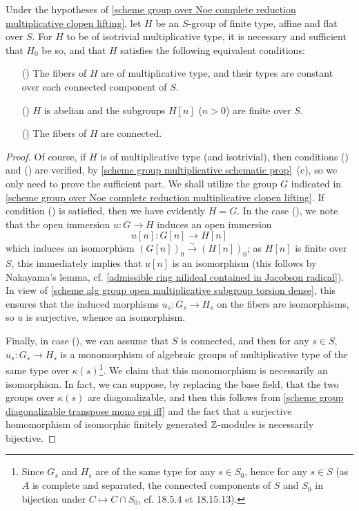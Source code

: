 \begin{corollary}\label{scheme group multiplicative over Noe complete isotrivial and reduction}
Under the hypotheses of \cref{scheme group over Noe complete reduction multiplicative clopen lifting}, let $H$ be an $S$-group of finite type, affine and flat over $S$. For $H$ to be of isotrivial multiplicative type, it is necessary and sufficient that $H_0$ be so, and that $H$ satisfies the following equivalent conditions:
\begin{enumerate}
    \item[(\rmnum{1})] The fibers of $H$ are of multiplicative type, and their types are constant over each connected component of $S$.
    \item[(\rmnum{2})] $H$ is abelian and the subgroups $H[n]$ ($n>0$) are finite over $S$.
    \item[(\rmnum{3})] The fibers of $H$ are connected.  
\end{enumerate}
\end{corollary}
\begin{proof}
Of course, if $H$ is of multiplicative type (and isotrivial), then conditions () and () are verified, by \cref{scheme group multiplicative schematic prop}~(c), so we only need to prove the sufficient part. We shall utilize the group $G$ indicated in \cref{scheme group over Noe complete reduction multiplicative clopen lifting}. If condition () is satisfied, then we have evidently $H=G$. In the case (), we note that the open immersion $u:G\to H$ induces an open immersion
\[u[n]:G[n]\to H[n]\]
which induces an isomorphism $(G[n])_0\stackrel{\sim}{\to}(H[n])_0$; as $H[n]$ is finite over $S$, this immediately implies that $u[n]$ is an isomorphism (this follows by Nakayama's lemma, cf. \cref{admissible ring nilideal contained in Jacobson radical}). In view of \cref{scheme alg group open multiplicative subgroup torsion dense}, this ensures that the induced morphisms $u_s:G_s\to H_s$ on the fibers are isomorphisms, so $u$ is surjective, whence an isomorphism.\par
Finally, in case (), we can assume that $S$ is connected, and then for any $s\in S$, $u_s:G_s\to H_s$ is a monomorphism of algebraic groups of multiplicative type of the same type over $\kappa(s)$\footnote{Since $G_s$ and $H_s$ are of the same type for any $s\in S_0$, hence for any $s\in S$ (as $A$ is complete and separated, the connected components of $S$ and $S_0$ in bijection under $C\mapsto C\cap S_0$, cf. \cite{EGA4-4} 18.5.4 et 18.15.13).}. We claim that this monomorphism is necessarily an isomorphism. In fact, we can suppose, by replacing the base field, that the two groups over $\kappa(s)$ are diagonalizable, and then this follows from \cref{scheme group diagonalizable transpose mono epi iff} and the fact that a surjective homomorphism of isomorphic finitely generated $\mathbb{Z}$-modules is necessarily bijective.
\end{proof}

